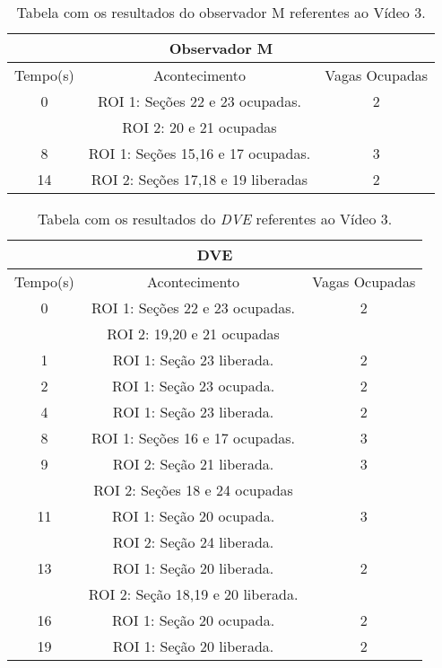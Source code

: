 \begin{table}[H]
\begin{center}
\begin{tabular}{|c||c||c|}
\hline
\multicolumn{3}{|c|}{Observador M}  \\ \hline \hline
Tempo(s) & Acontecimento & Vagas Ocupadas\\ \hline
0 & ROI 1: Seções 22 e 23 ocupadas. & 2 \\
 & ROI 2: 20 e 21 ocupadas & \\ \hline
8 & ROI 1: Seções 15,16 e 17 ocupadas. & 3 \\ \hline
14 & ROI 2: Seções 17,18 e 19 liberadas & 2\\
\hline
\end{tabular}
\end{center}
\caption{Tabela com os resultados do observador M referentes ao Vídeo 3.}
\label{tab:video3M}
\end{table}

\begin{table}[H]
\begin{center}
\begin{tabular}{|c||c||c|}
\hline
\multicolumn{3}{|c|}{DVE}  \\ \hline \hline
Tempo(s) & Acontecimento & Vagas Ocupadas\\ \hline
0 & ROI 1: Seções 22 e 23 ocupadas. & 2 \\
 & ROI 2: 19,20 e 21 ocupadas &  \\ \hline
1 & ROI 1: Seção 23 liberada. & 2 \\ \hline
2 & ROI 1: Seção 23 ocupada. & 2 \\ \hline
4 & ROI 1: Seção 23 liberada. & 2 \\ \hline
8 & ROI 1: Seções 16 e 17 ocupadas. & 3 \\ \hline
9 & ROI 2: Seção 21 liberada. & 3 \\ 
 & ROI 2: Seções 18 e 24 ocupadas &  \\ \hline
11 & ROI 1: Seção 20 ocupada. & 3 \\ 
 & ROI 2: Seção 24 liberada. \\ \hline
13 & ROI 1: Seção 20 liberada. & 2 \\
 & ROI 2: Seção 18,19 e 20 liberada. & \\ \hline
16 & ROI 1: Seção 20 ocupada. & 2 \\ \hline
19 & ROI 1: Seção 20 liberada. & 2 \\
\hline
\end{tabular}
\end{center}
\caption{Tabela com os resultados do \textit{DVE} referentes ao Vídeo 3.}
\label{tab:video3}
\end{table}

